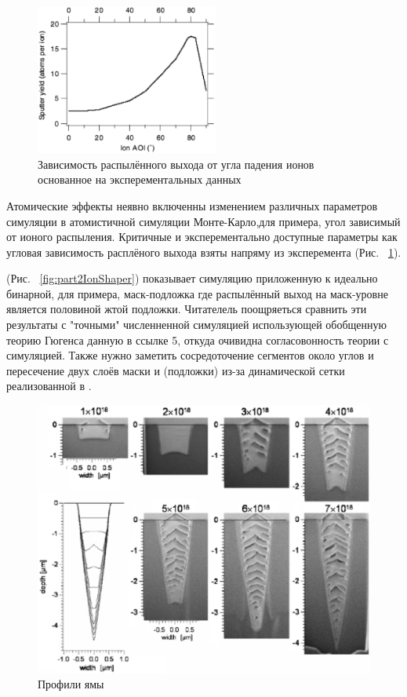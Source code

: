 \documentclass[a4paper,fontsize=12pt]{article}
\begin{document}
\begin{figure}[h]
    \centering
    \includegraphics[width=6cm]{images/part2/2.eps}
    \caption{Зависимость распылённого выхода от угла падения ионов основанное на эксперементальных данных}
    \label{fig:part2SputterYield}
\end{figure}

Атомические эффекты неявно включенны изменением различных параметров симуляции в атомистичной симуляции Монте-Карло,для примера, угол зависимый от ионого распыления. Критичные и эксперементально доступные параметры как угловая зависимость расплёного выхода взяты напряму из эксперемента (Рис. ~\ref{fig:part2SputterYield}).

(Рис. ~\ref{fig:part2IonShaper}) показывает \ion{} симуляцию приложенную к идеально бинарной, для примера, маск-подложка где распылённый выход на маск-уровне является половиной жтой подложки. Читателель поощряеться сравнить эти результаты с "точными" численненной симуляцией использующей обобщенную теорию Гюгенса данную в ссылке 5, откуда очивидна согласовонность теории с симуляцией. Также нужно заметить сосредоточение сегментов около углов и пересечение двух слоёв маски и (подложки) из-за динамической сетки реализованной в \ion{}.

\newpage

\begin{figure}[h]
    \centering
    \includegraphics[width=15cm]{images/part2/3.eps}
    \caption{Профили ямы}
    \label{fig:part2Many}
\end{figure}
\end{document}
